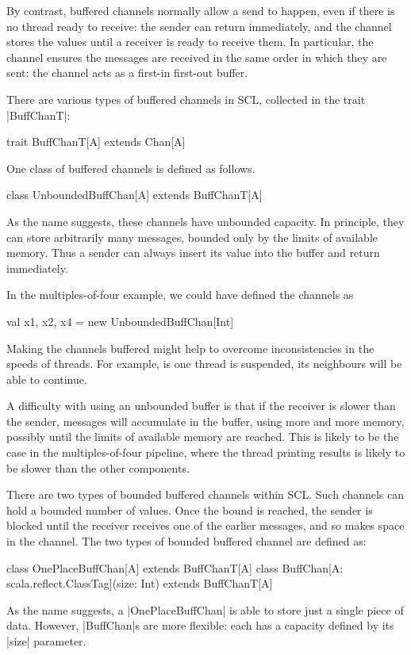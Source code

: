 By contrast, buffered channels normally allow a send to happen, even if there
is no thread ready to receive: the sender can return immediately, and the
channel stores the values until a receiver is ready to receive them.  In
particular, the channel ensures the messages are received in the same order in
which they are sent: the channel acts as a first-in first-out buffer.

There are various types of buffered channels in SCL, collected in the trait
|BuffChanT|: 
\begin{scala}
trait BuffChanT[A] extends Chan[A]
\end{scala}
%
One class of buffered channels is defined as follows. 
%
\begin{scala}
class UnboundedBuffChan[A] extends BuffChanT[A]
\end{scala}
%
As the name suggests, these channels have unbounded capacity. In principle,
they can store arbitrarily many messages, bounded only by the limits of
available memory.  Thus a sender can always insert its value into the buffer
and return immediately. 

In the multiples-of-four example, we could have defined the channels as 
%
\begin{scala}
  val x1, x2, x4 = new UnboundedBuffChan[Int]
\end{scala}
%
Making the channels buffered might help to overcome inconsistencies in the
speeds of threads.  For example, is one thread is suspended, its neighbours
will be able to continue.

A difficulty with using an unbounded buffer is that if the receiver is slower
than the sender, messages will accumulate in the buffer, using more and more
memory, possibly until the limits of available memory are reached.  This is
likely to be the case in the multiples-of-four pipeline, where the thread
printing results is likely to be slower than the other components. 

There are two types of bounded buffered channels within SCL\@.  Such channels
can hold a bounded number of values.  Once the bound is reached, the sender is
blocked until the receiver receives one of the earlier messages, and so makes
space in the channel.
%
The two types of bounded buffered channel are defined as:
%
\begin{scala}
class OnePlaceBuffChan[A] extends BuffChanT[A]
class BuffChan[A: scala.reflect.ClassTag](size: Int) extends BuffChanT[A]
\end{scala}
%
As the name suggests, a |OnePlaceBuffChan| is able to store just a single
piece of data.  However, |BuffChan|s are more flexible: each has a capacity
defined by its |size| parameter.

